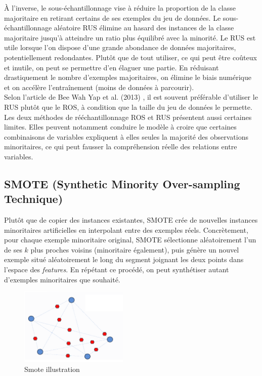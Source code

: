 \documentclass{article}
\begin{document}
À l’inverse, le sous-échantillonnage vise à réduire la proportion de la classe
majoritaire en retirant certains de ses exemples du jeu de données. Le sous-échantillonnage aléatoire
RUS élimine au hasard des instances de la classe majoritaire jusqu’à atteindre
un ratio plus équilibré avec la minorité. Le RUS est utile lorsque l’on dispose d’une grande abondance de
données majoritaires, potentiellement redondantes. Plutôt que de tout utiliser, ce qui peut être
coûteux et inutile, on peut se permettre d’en élaguer une partie. En réduisant drastiquement le nombre
d’exemples majoritaires, on élimine le biais numérique et on accélère l’entraînement (moins de
données à parcourir).
\\

Selon l'article de Bee Wah Yap et al. (2013) \cite{MerwanC}, il est souvent préférable d’utiliser le RUS plutôt que le ROS, à condition que la taille du jeu de données le permette.
\\

Les deux méthodes de rééchantillonnage ROS et RUS présentent aussi certaines limites. Elles peuvent notamment conduire le modèle à croire que certaines combinaisons de variables expliquent à
elles seules la majorité des observations minoritaires, ce qui peut fausser la compréhension
réelle des relations entre variables.

\subsection{SMOTE (Synthetic Minority Over-sampling Technique)}

Plutôt que de copier des instances existantes,
SMOTE crée de nouvelles instances minoritaires artificielles en interpolant entre des exemples réels. Concrètement, pour chaque exemple minoritaire original, SMOTE sélectionne aléatoirement l’un de ses
$k$ plus proches voisins (minoritaire également), puis génère un nouvel exemple situé aléatoirement le
long du segment joignant les deux points dans l’espace des \textit{features}. En répétant ce procédé, on
peut synthétiser autant d’exemples minoritaires que souhaité.

\begin{figure}[h!]
   \centering
   \includegraphics[width=0.46\textwidth]{images/smote.png}
   \caption{Smote illustration}
   \label{fig:example}
\end{figure}
\end{document}
